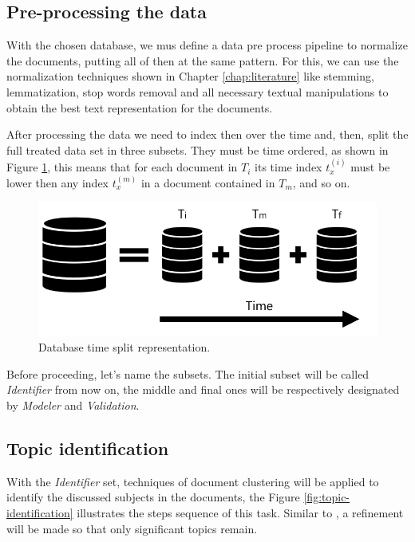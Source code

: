 \subsection{Pre-processing the data}

With the chosen database, we mus define a data pre process pipeline to normalize the documents, putting all of then at the same pattern. For this, we can use the normalization techniques shown in Chapter \ref{chap:literature} like stemming, lemmatization, stop words removal and all necessary textual manipulations to obtain the best text representation for the documents.

After processing the data we need to index then over the time and, then, split the full treated data set in three subsets. They must be time ordered, as shown in Figure \ref{fig:database}, this means that for each document in $T_{i}$ its time index $t_{x}^{(i)}$ must be lower then any index $t_{x}^{(m)}$ in a document contained in $T_{m}$, and so on.

\begin{figure}[h!]
	\centering
	\includegraphics[width=0.6\linewidth]{01.Chapters/04.Materials/database}
	\caption{Database time split representation.}
	\label{fig:database}
\end{figure}

Before proceeding, let's name the subsets. The initial subset will be called \textit{Identifier} from now on, the middle and final ones will be respectively designated by \textit{Modeler} and \textit{Validation}. 

\subsection{Topic identification}

With the \textit{Identifier} set, techniques of document clustering will be applied to identify the  discussed subjects in the documents, the Figure \ref{fig:topic-identification} illustrates the steps sequence of this task. Similar to , a refinement will be made so that only significant topics remain. 

